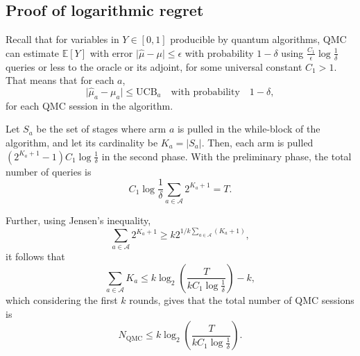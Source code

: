 \subsection{Proof of logarithmic regret}
Recall that for variables in $Y \in [0, 1]$ producible by quantum algorithms, QMC can estimate $\mathbb{E}[Y]$ with error $\lvert\hat{\mu} - \mu\rvert \leq \epsilon$ with probability $1-\delta$ using $\frac{C_1}{\epsilon} \log \frac{1}{\delta}$ queries or less to the oracle or its adjoint, for some universal constant $C_1>1$.
That means that for each $a$,
\begin{equation}
    \lvert\hat{\mu}_a - \mu_a\rvert \leq \text{UCB}_a
    \quad \text{with probability} \quad
    1 - \delta,
    \label{eq:wan_qmc}
\end{equation}
for each QMC session in the algorithm.

Let $S_a$ be the set of stages where arm $a$ is pulled in the while-block of the algorithm, and let its cardinality be $K_a = |S_a|$.
Then, each arm is pulled $(2^{K_a + 1} - 1)C_1 \log \frac1\delta$ in the second phase.
With the preliminary phase, the total number of queries is
\begin{equation}
    C_1 \log \frac{1}{\delta} \sum_{a \in \mathcal{A}} 2^{K_a + 1} = T.
\end{equation}

Further, using Jensen's inequality,
\begin{equation}
    \sum_{a \in \mathcal{A}} 2^{K_a + 1} \geq k 2^{1/k \sum_{a \in \mathcal{A}} (K_a + 1)},
\end{equation}
it follows that
\begin{equation}
    \sum_{a \in \mathcal{A}} K_a
    \leq
    k \log_2 \left(\frac{T}{k C_1 \log \frac{1}{\delta}}\right) -k,
\end{equation}
which considering the first $k$ rounds, gives that the total number of QMC sessions is
\begin{equation}
    N_{\text{QMC}} \leq k \log_2 \left(\frac{T}{k C_1 \log \frac{1}{\delta}}\right).
\end{equation}

